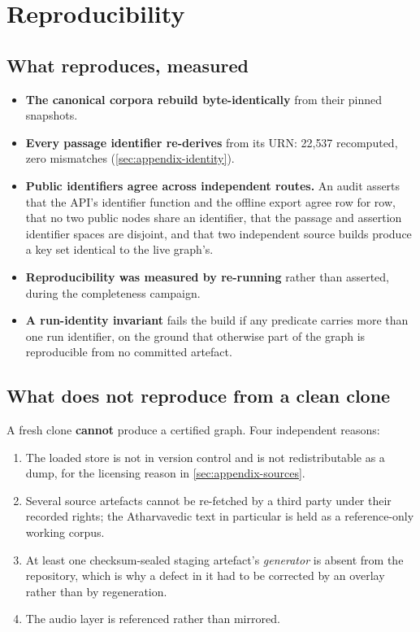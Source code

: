 \section{Reproducibility}
\label{sec:appendix-repro}

\subsection{What reproduces, measured}

\begin{itemize}[leftmargin=1.6em,itemsep=2pt,topsep=3pt]
\item \textbf{The canonical corpora rebuild byte-identically} from their pinned
snapshots.
\item \textbf{Every passage identifier re-derives} from its \mbox{URN}: 22{,}537
recomputed, zero mismatches (\cref{sec:appendix-identity}).
\item \textbf{Public identifiers agree across independent routes.} An audit asserts
that the \mbox{API}'s identifier function and the offline export agree row for row,
that no two public nodes share an identifier, that the passage and assertion
identifier spaces are disjoint, and that two independent source builds produce a key
set identical to the live graph's.
\item \textbf{Reproducibility was measured by re-running} rather than asserted,
during the completeness campaign.
\item \textbf{A run-identity invariant} fails the build if any predicate carries more
than one run identifier, on the ground that otherwise part of the graph is
reproducible from no committed artefact.
\end{itemize}

\subsection{What does not reproduce from a clean clone}

A fresh clone \textbf{cannot} produce a certified graph. Four independent reasons:

\begin{enumerate}[leftmargin=1.6em,itemsep=2pt,topsep=3pt]
\item The loaded store is not in version control and is not redistributable as a
dump, for the licensing reason in \cref{sec:appendix-sources}.
\item Several source artefacts cannot be re-fetched by a third party under their
recorded rights; the Atharvavedic text in particular is held as a reference-only
working corpus.
\item At least one checksum-sealed staging artefact's \emph{generator} is absent from
the repository, which is why a defect in it had to be corrected by an overlay rather
than by regeneration.
\item The audio layer is referenced rather than mirrored.
\end{enumerate}

